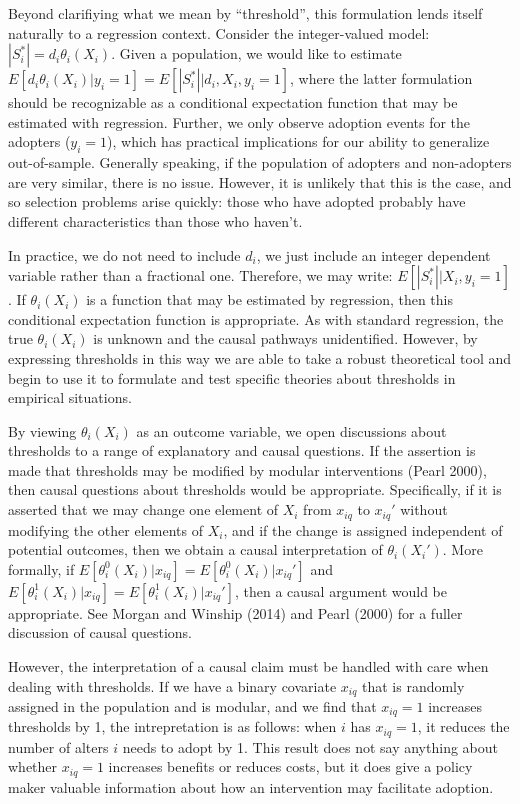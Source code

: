 \documentclass{article}
\begin{document}
Beyond clarifiying what we mean by ``threshold'', this formulation lends itself naturally to a regression context. Consider the integer-valued model: $|S_i^*| = d_i\theta_i(X_i)$. Given a population, we would like to estimate $E[d_i\theta_i(X_i) | y_i = 1] = E[|S_i^*| | d_i, X_i, y_i=1]$, where the latter formulation should be recognizable as a conditional expectation function that may be estimated with regression. Further, we only observe adoption events for the adopters ($y_i = 1$), which has practical implications for our ability to generalize out-of-sample. Generally speaking, if the population of adopters and non-adopters are very similar, there is no issue. However, it is unlikely that this is the case, and so selection problems arise quickly: those who have adopted probably have different characteristics than those who haven't. 

In practice, we do not need to include $d_i$, we just include an integer dependent variable rather than a fractional one. Therefore, we may write: $E[|S_i^*||X_i,y_i=1]$. If $\theta_i(X_i)$ is a function that may be estimated by regression, then this conditional expectation function is appropriate. As with standard regression, the true $\theta_i(X_i)$ is unknown and the causal pathways unidentified. However, by expressing thresholds in this way we are able to take a robust theoretical tool and begin to use it to formulate and test specific theories about thresholds in empirical situations.

By viewing $\theta_i(X_i)$ as an outcome variable, we open discussions about thresholds to a range of explanatory and causal questions. If the assertion is made that thresholds may be modified by modular interventions (Pearl 2000), then causal questions about thresholds would be appropriate. Specifically, if it is asserted that we may change one element of $X_i$ from $x_{iq}$ to $x_{iq}'$ without modifying the other elements of $X_i$, and if the change is assigned independent of potential outcomes, then we obtain a causal interpretation of $\theta_i(X_i')$. More formally, if $E[\theta_i^0(X_i)|x_{iq}] = E[\theta_i^0(X_i)|x_{iq}']$ and $E[\theta_i^1(X_i)|x_{iq}] = E[\theta_i^1(X_i)|x_{iq}']$, then a causal argument would be appropriate. See Morgan and Winship (2014) and Pearl (2000) for a fuller discussion of causal questions. 

However, the interpretation of a causal claim must be handled with care when dealing with thresholds. If we have a binary covariate $x_{iq}$ that is randomly assigned in the population and is modular, and we find that $x_{iq} = 1$ increases thresholds by 1, the intrepretation is as follows: when $i$ has $x_{iq} = 1$, it reduces the number of alters $i$ needs to adopt by 1. This result does not say anything about whether $x_{iq} = 1$ increases benefits or reduces costs, but it does give a policy maker valuable information about how an intervention may facilitate adoption.
\end{document}
